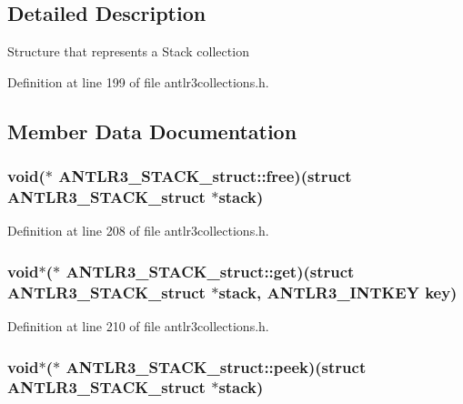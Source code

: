 \subsection{Detailed Description}
Structure that represents a Stack collection 

Definition at line 199 of file antlr3collections.\-h.



\subsection{Member Data Documentation}
\hypertarget{struct_a_n_t_l_r3___s_t_a_c_k__struct_a7a3b9cc26d605b38e1e8c3fa81f52a25}{
\subsubsection[{free}]{\setlength{\rightskip}{0pt plus 5cm}void($\ast$ A\-N\-T\-L\-R3\-\_\-\-S\-T\-A\-C\-K\-\_\-struct\-::free)(struct {\bf A\-N\-T\-L\-R3\-\_\-\-S\-T\-A\-C\-K\-\_\-struct} $\ast$stack)}}\label{struct_a_n_t_l_r3___s_t_a_c_k__struct_a7a3b9cc26d605b38e1e8c3fa81f52a25}


Definition at line 208 of file antlr3collections.\-h.

\hypertarget{struct_a_n_t_l_r3___s_t_a_c_k__struct_a78896dc210e11aa79ba8edee9349ab6f}{
\subsubsection[{get}]{\setlength{\rightskip}{0pt plus 5cm}void$\ast$($\ast$ A\-N\-T\-L\-R3\-\_\-\-S\-T\-A\-C\-K\-\_\-struct\-::get)(struct {\bf A\-N\-T\-L\-R3\-\_\-\-S\-T\-A\-C\-K\-\_\-struct} $\ast$stack, {\bf A\-N\-T\-L\-R3\-\_\-\-I\-N\-T\-K\-E\-Y} key)}}\label{struct_a_n_t_l_r3___s_t_a_c_k__struct_a78896dc210e11aa79ba8edee9349ab6f}


Definition at line 210 of file antlr3collections.\-h.

\hypertarget{struct_a_n_t_l_r3___s_t_a_c_k__struct_a333185358f1536e962df8e3021e87143}{
\subsubsection[{peek}]{\setlength{\rightskip}{0pt plus 5cm}void$\ast$($\ast$ A\-N\-T\-L\-R3\-\_\-\-S\-T\-A\-C\-K\-\_\-struct\-::peek)(struct {\bf A\-N\-T\-L\-R3\-\_\-\-S\-T\-A\-C\-K\-\_\-struct} $\ast$stack)}}\label{struct_a_n_t_l_r3___s_t_a_c_k__struct_a333185358f1536e962df8e3021e87143}


